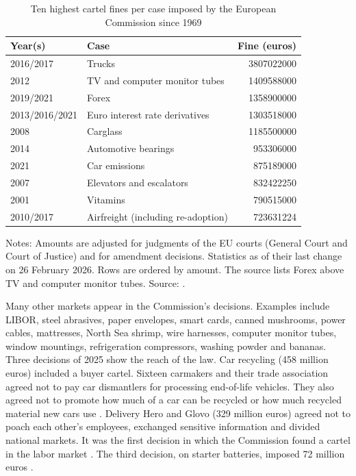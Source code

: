 \begin{table}[htbp]
\centering
\caption{Ten highest cartel fines per case imposed by the European Commission since 1969}
\label{tab:12-eu-fines}
\begin{tabular}{llr}
\toprule
Year(s) & Case & Fine (euros) \\
\midrule
2016/2017      & Trucks                                   & \num{3807022000} \\
2012           & TV and computer monitor tubes            & \num{1409588000} \\
2019/2021      & Forex                                    & \num{1358900000} \\
2013/2016/2021 & Euro interest rate derivatives           & \num{1303518000} \\
2008           & Carglass                                 & \num{1185500000} \\
2014           & Automotive bearings                      & \num{953306000} \\
2021           & Car emissions                            & \num{875189000} \\
2007           & Elevators and escalators                 & \num{832422250} \\
2001           & Vitamins                                 & \num{790515000} \\
2010/2017      & Airfreight (including re-adoption)       & \num{723631224} \\
\bottomrule
\end{tabular}

\smallskip
\begin{minipage}{0.86\textwidth}\footnotesize
Notes: Amounts are adjusted for judgments of the EU courts (General Court and Court of Justice) and for amendment
decisions. Statistics as of their last change on 26 February 2026. Rows are ordered by amount. The source lists
Forex above TV and computer monitor tubes. Source: \citet[Table~5]{EuropeanCommission2026}.
\end{minipage}
\end{table}

Many other markets appear in the Commission's decisions. Examples include LIBOR, steel abrasives, paper envelopes,
smart cards, canned mushrooms, power cables, mattresses, North Sea shrimp, wire harnesses, computer monitor tubes,
window mountings, refrigeration compressors, washing powder and bananas. Three decisions of 2025 show the reach of
the law. Car recycling (458 million euros) included a buyer cartel. Sixteen carmakers and their trade association
agreed not to pay car dismantlers for processing end-of-life vehicles. They also agreed not to promote how much of a
car can be recycled or how much recycled material new cars use \citep{EuropeanCommission2025a}. Delivery Hero and
Glovo (329 million euros) agreed not to poach each other's employees, exchanged sensitive information and divided
national markets. It was the first decision in which the Commission found a cartel in the labor market
\citep{EuropeanCommission2025b}. The third decision, on starter batteries, imposed 72 million euros
\citep{EuropeanCommission2025c}.

